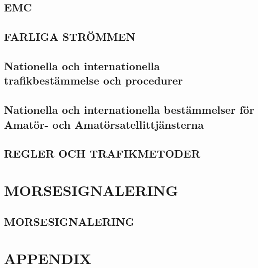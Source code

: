 \documentclass[a4paper,twoside,openright]{book}
\begin{document}
\chapter{EMC}







\chapter{FARLIGA STRÖMMEN}







\chapter{Nationella och internationella trafikbestämmelse och procedurer}







\chapter{Nationella och internationella bestämmelser för Amatör- och
  Amatörsatellittjänsterna}




\chapter{REGLER OCH TRAFIKMETODER}


\part{MORSESIGNALERING}
\chapter{MORSESIGNALERING}



\appendix
\part{APPENDIX}













\listoffigures
\listoftables

\onecolumn



\backmatter

\printindex

\end{document}

